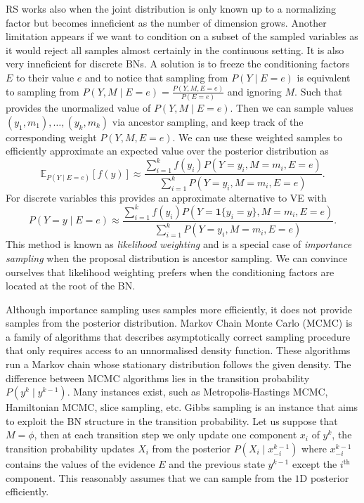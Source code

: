 RS works also when the joint distribution is only known up to a normalizing factor but becomes inneficient as the number of dimension grows. Another limitation appears if we want to condition on a subset of the sampled variables as it would reject all samples almost certainly in the continuous setting. It is also very inneficient for discrete BNs. A solution is to freeze the conditioning factors $E$ to their value $e$ and to notice that sampling from $P(Y\mid E=e)$ is equivalent to sampling from $P(Y, M\mid E=e) = \frac{P(Y, M, E=e)}{P(E=e)}$ and ignoring $M$. Such that  provides the unormalized value of $P(Y, M\mid E=e)$. Then we can sample values $(y_1, m_1), \dots, (y_k, m_k)$ via ancestor sampling, and keep track of the corresponding weight $P(Y, M, E=e)$. We can use these weighted samples to efficiently approximate an expected value over the posterior distribution as
$$ \mathbb{E}_{P(Y\mid E=e)}\left[f(y)\right] \approx \frac{\sum_{i=1}^k f(y_i) P(Y=y_i, M=m_i, E=e)}{\sum_{i=1}^k P(Y=y_i, M=m_i, E=e) }.$$ For discrete variables this provides an approximate alternative to VE with $$P(Y=y\mid E=e) \approx \frac{\sum_{i=1}^k f(y_i) P(Y=\bm{1}\{y_i = y\}, M=m_i, E=e)}{\sum_{i=1}^k P(Y=y_i, M=m_i, E=e)}. $$ This method is known as \textit{likelihood weighting} and is a special case of \textit{importance sampling} when the proposal distribution is ancestor sampling. We can convince ourselves that likelihood weighting prefers when the conditioning factors are located at the root of the BN.

Although importance sampling uses samples more efficiently, it does not provide samples from the posterior distribution. Markov Chain Monte Carlo (MCMC) is a family of algorithms that describes asymptotically correct sampling procedure that only requires access to an unnormalised density function. These algorithms run a Markov chain whose stationary distribution follows the given density. The difference between MCMC algorithms lies in the transition probability $P(y^k\mid y^{k-1})$. Many instances exist, such as Metropolis-Hastings MCMC, Hamiltonian MCMC, slice sampling, etc. Gibbs sampling is an instance that aims to exploit the BN structure in the transition probability. Let us suppose that $M = \phi$, then at each transition step we only update one component $x_i$ of $y^k$, the transition probability updates $X_i$ from the posterior $P(X_i\mid x_{-i}^{k-1})$ where $x_{-i}^{k-1}$ contains the values of the evidence $E$ and the previous state $y^{k-1}$ except the $i^{\text{th}}$ component. This reasonably assumes that we can sample from the $1$D posterior efficiently.

